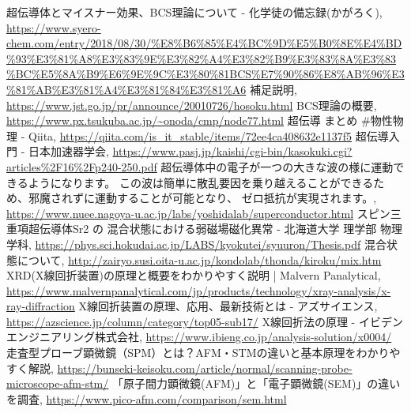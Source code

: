 \documentclass[11pt,a4paper]{ltjsarticle}
\begin{document}
\begin{thebibliography}{99}
     超伝導体とマイスナー効果、BCS理論について - 化学徒の備忘録(かがろく), \url{https://www.syero-chem.com/entry/2018/08/30/%E8%B6%85%E4%BC%9D%E5%B0%8E%E4%BD%93%E3%81%A8%E3%83%9E%E3%82%A4%E3%82%B9%E3%83%8A%E3%83%BC%E5%8A%B9%E6%9E%9C%E3%80%81BCS%E7%90%86%E8%AB%96%E3%81%AB%E3%81%A4%E3%81%84%E3%81%A6}
     補足説明, \url{https://www.jst.go.jp/pr/announce/20010726/hosoku.html}
     BCS理論の概要, \url{https://www.px.tsukuba.ac.jp/~onoda/cmp/node77.html}
     超伝導 まとめ \#物性物理 - Qiita, \url{https://qiita.com/is_it_stable/items/72ee4ca408632e1137f5}
     超伝導入門 - 日本加速器学会, \url{https://www.pasj.jp/kaishi/cgi-bin/kasokuki.cgi?articles%2F16%2Fp240-250.pdf}
     超伝導体中の電子が一つの大きな波の様に運動できるようになります。 この波は簡単に散乱要因を乗り越えることができるため、邪魔されずに運動することが可能となり、 ゼロ抵抗が実現されます。, \url{https://www.nuee.nagoya-u.ac.jp/labs/yoshidalab/superconductor.html}
     スピン三重項超伝導体Sr2 の 混合状態における弱磁場磁化異常 - 北海道大学 理学部 物理学科, \url{https://phys.sci.hokudai.ac.jp/LABS/kyokutei/syuuron/Thesis.pdf}
     混合状態について, \url{http://zairyo.susi.oita-u.ac.jp/kondolab/thonda/kiroku/mix.htm}
     XRD(X線回折装置)の原理と概要をわかりやすく説明 | Malvern Panalytical, \url{https://www.malvernpanalytical.com/jp/products/technology/xray-analysis/x-ray-diffraction}
     X線回折装置の原理、応用、最新技術とは - アズサイエンス, \url{https://azscience.jp/column/category/top05-sub17/}
     X線回折法の原理 - イビデンエンジニアリング株式会社, \url{https://www.ibieng.co.jp/analysis-solution/x0004/}
     走査型プローブ顕微鏡（SPM）とは？AFM・STMの違いと基本原理をわかりやすく解説, \url{https://bunseki-keisoku.com/article/normal/scanning-probe-microscope-afm-stm/}
     「原子間力顕微鏡(AFM)」と「電子顕微鏡(SEM)」の違いを調査, \url{https://www.pico-afm.com/comparison/sem.html}
\end{thebibliography}
\end{document}
